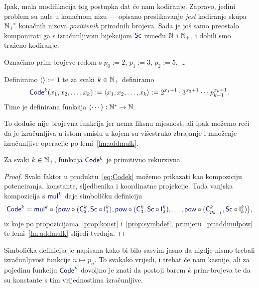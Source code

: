 Ipak, mala modifikacija tog postupka dat će nam kodiranje. Zapravo, jedini problem su nule u konačnom nizu --- opisano preslikavanje \emph{jest} kodiranje skupa ${{\mathbb N}_+\!}^*$ konačnih nizova \emph{pozitivnih} prirodnih brojeva. Sada je još samo preostalo komponirati ga s izračunljivom bijekcijom $\f{Sc}$ između ${\mathbb N}$ i ${\mathbb N}_+$, i dobili smo traženo kodiranje.

\begin{definicija}[{name=[kodiranje konačnih nizova prirodnih brojeva]}]
	Označimo prim-brojeve redom s $p_0:=2$, $p_1:=3$, $p_2:=5$,~\dots

	Definiramo $\langle\rangle:=1$ te za svaki $k\in{\mathbb N}_+$ definiramo 
\begin{equation}\label{eq:Codek}
    \f{Code}^k(x_1,x_2,\dotsc,x_k):=\langle x_1,x_2,\dotsc,x_k\rangle:=2^{x_1+1}\cdot3^{x_2+1}\mathbin{\dotsm}p_{k-1}^{x_k+1}\text.
\end{equation}
Time je definirana funkcija $\langle\cdots\rangle:{\mathbb N}^*\to{\mathbb N}$.
\end{definicija}

To doduše nije brojevna funkcija jer nema fiksnu mjesnost, ali ipak možemo reći da je izračunljiva u istom smislu u kojem su višestruko zbrajanje i množenje izračunljive operacije po lemi~\ref{lm:addmulk}.

\begin{propozicija}[{name=[primitivna rekurzivnost kodiranja konačnih nizova]}]\label{prop:Codekprn}
Za svaki $k\in{\mathbb N}_+$, funkcija $\f{Code}^k$ je primitivno rekurzivna.
\end{propozicija}
\begin{proof}
    Svaki faktor u produktu~\eqref{eq:Codek} možemo prikazati kao kompoziciju potenciranja, konstante, sljedbenika i koordinatne projekcije. Tada vanjska kompozicija s $\f{mul}^k$ daje simboličku definiciju
    \begin{equation}\f{Code}^k=\f{mul}^k\circ\bigl(\f{pow}\circ(\f C_2^k,\f{Sc}\circ\f I_1^k),\f{pow}\circ(\f C_3^k,\f{Sc}\circ\f I_2^k),\dotsc,\f{pow}\circ(\f C_{p_{k-1}}^k,\f{Sc}\circ\f I_k^k)\bigr)\text,
    \end{equation}
    iz koje po propozicijama~\ref{prop:konst} i~\ref{prop:symbdef}, primjeru~\ref{pr:addmulpow} te lemi~\ref{lm:addmulk} slijedi tvrdnja.
\end{proof}

Simbolička definicija je napisana kako bi bilo sasvim jasno da nigdje nismo trebali izračunljivost funkcije $n\mapsto p_n$. To svakako vrijedi, i trebat će nam kasnije, ali za pojedinu funkciju $\f{Code}^k$ dovoljno je znati da postoji barem $k$ prim-brojeva te da su konstante s tim vrijednostima izračunljive.


